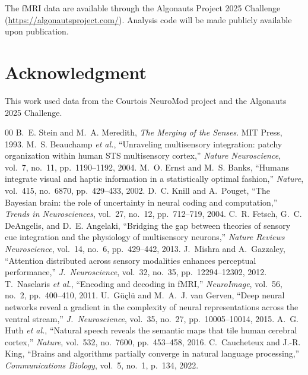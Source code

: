 \documentclass[conference]{IEEEtran}
\begin{document}
The fMRI data are available through the Algonauts Project 2025 Challenge (\url{https://algonautsproject.com/}). Analysis code will be made publicly available upon publication.

\section*{Acknowledgment}

This work used data from the Courtois NeuroMod project and the Algonauts 2025 Challenge.

\begin{thebibliography}{00}
 B.~E. Stein and M.~A. Meredith, \textit{The Merging of the Senses}. MIT Press, 1993.
 M.~S. Beauchamp \textit{et al.}, ``Unraveling multisensory integration: patchy organization within human STS multisensory cortex,'' \textit{Nature Neuroscience}, vol.~7, no.~11, pp.~1190--1192, 2004.
 M.~O. Ernst and M.~S. Banks, ``Humans integrate visual and haptic information in a statistically optimal fashion,'' \textit{Nature}, vol.~415, no.~6870, pp.~429--433, 2002.
 D.~C. Knill and A.~Pouget, ``The Bayesian brain: the role of uncertainty in neural coding and computation,'' \textit{Trends in Neurosciences}, vol.~27, no.~12, pp.~712--719, 2004.
 C.~R. Fetsch, G.~C. DeAngelis, and D.~E. Angelaki, ``Bridging the gap between theories of sensory cue integration and the physiology of multisensory neurons,'' \textit{Nature Reviews Neuroscience}, vol.~14, no.~6, pp.~429--442, 2013.
 J.~Mishra and A.~Gazzaley, ``Attention distributed across sensory modalities enhances perceptual performance,'' \textit{J.~Neuroscience}, vol.~32, no.~35, pp.~12294--12302, 2012.
 T.~Naselaris \textit{et al.}, ``Encoding and decoding in fMRI,'' \textit{NeuroImage}, vol.~56, no.~2, pp.~400--410, 2011.
 U.~G{\"u}{\c{c}}l{\"u} and M.~A.~J. van Gerven, ``Deep neural networks reveal a gradient in the complexity of neural representations across the ventral stream,'' \textit{J.~Neuroscience}, vol.~35, no.~27, pp.~10005--10014, 2015.
 A.~G. Huth \textit{et al.}, ``Natural speech reveals the semantic maps that tile human cerebral cortex,'' \textit{Nature}, vol.~532, no.~7600, pp.~453--458, 2016.
 C.~Caucheteux and J.-R. King, ``Brains and algorithms partially converge in natural language processing,'' \textit{Communications Biology}, vol.~5, no.~1, p.~134, 2022.

\end{thebibliography}
\end{document}
